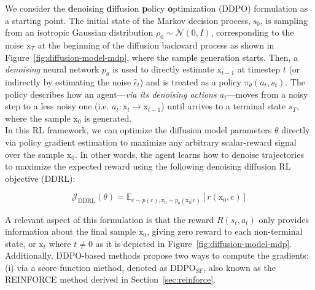 We consider the \textbf{d}enoising \textbf{d}iffusion \textbf{p}olicy
\textbf{o}ptimization (DDPO) formulation \citep{black2023training} as a 
starting point. The initial state of the Markov decision process,
$\mathrm{s}_{0}$, is sampling from an isotropic Gaussian distribution 
$\rho_{0}\sim\mathcal{N}(0, I)$, corresponding to the
noise $\mathrm{x}_{T}$ at the beginning of the
diffusion backward process as shown in Figure~\ref{fig:diffusion-model-mdp},
where the sample generation starts. 
Then, a \textit{denoising} neural network $p_{\theta}$ is used to directly
estimate $\mathrm{x}_{t-1}$ at timestep $t$ (or indirectly by estimating the
noise $\hat{\epsilon}_{t}$) and is treated as a policy $\pi_{\theta}(a_{t}, s_{t})$. The policy describes how an agent---\textit{via its denoising actions $a_{t}$}---moves from a noisy
step to a less noisy one (i.e. $a_t: \mathrm{x}_{t} \rightarrow \mathrm{x}_{t-1}$) until arrives to a terminal state $s_T$, where the sample $\mathrm{x}_{0}$ is generated. \\

\noindent In this RL framework, we can optimize the diffusion
model parameters $\theta$ directly via policy gradient estimation to maximize any arbitrary scalar-reward signal over the sample $\mathrm{x}_{0}$.
In other words, the agent learns how to denoise trajectories to maximize the expected reward using the following denoising diffusion RL objective (DDRL):


\begin{equation}\label{difusion-rl-objective-1}
  \mathcal{J}_{\text{DDRL}}(\theta)
  = \mathbb{E}_{\mathrm{c}\sim p(\mathrm{c}),  \mathrm{x}_{0}\sim p_{\theta}(\mathrm{x}_{0}|\mathrm{c})}[ r(\mathrm{x}_{0}, \mathrm{c})]
\end{equation}

\noindent A relevant aspect of this formulation is that the reward $R(s_{t}, a_{t})$ only provides information about the final sample $\mathrm{x}_{0}$, giving zero reward to each non-terminal state, or $\mathrm{x}_{t}$ where $t\neq0$ as it is depicted in Figure~\ref{fig:diffusion-model-mdp}. Additionally, DDPO-based methods propose two ways to compute the gradients: (i) via a score function method, denoted as $\text{DDPO}_{\text{SF}}$, also known as the REINFORCE method derived in Section~\ref{sec:reinforce}.

